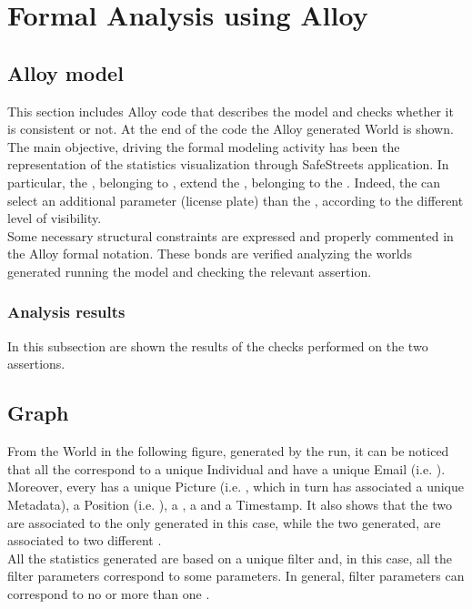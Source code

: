 \documentclass[../RASD.tex]{subfiles}
\begin{document}
\chapter{Formal Analysis using Alloy}
\thispagestyle{fancy}
	\section{Alloy model}
	
	This section includes Alloy code that describes the model and checks whether it is consistent or not. At the end of the code the Alloy generated World is shown. \\
	The main objective, driving the formal modeling activity has been the representation of the statistics visualization through SafeStreets application. In particular, the , belonging to , extend the , belonging to the . Indeed, the  can select an additional parameter (license plate) than the , according to the different level of visibility. \\
	Some necessary structural constraints are expressed and properly commented in the Alloy formal notation. These bonds are verified analyzing the worlds generated running the model and checking the relevant assertion. \\
	
	

		\subsection{Analysis results}
		
		In this subsection are shown the results of the checks performed on the two assertions. 
	\section{Graph}
	
	From the World in the following figure, generated by the run, it can be noticed that all the  correspond to a unique Individual and have a unique Email (i.e. ). Moreover, every  has a unique Picture (i.e. , which in turn has associated a unique Metadata), a Position (i.e. ), a , a  and a Timestamp. It also shows that the two  are associated to the only  generated in this case, while the two  generated, are associated to two different . \\
	All the statistics generated are based on a unique filter and, in this case, all the filter parameters correspond to some  parameters.
	In general, filter parameters can correspond to no or more than one . 
	
\end{document}
